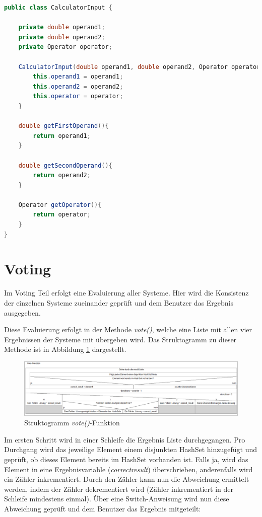 \begin{lstlisting}[language=Java,basicstyle=\scriptsize, caption=CalculatorInput Klasse,label=lst:CalculatorInput]
public class CalculatorInput {

    private double operand1;
    private double operand2;
    private Operator operator;

    CalculatorInput(double operand1, double operand2, Operator operator){
        this.operand1 = operand1;
        this.operand2 = operand2;
        this.operator = operator;
    }

    double getFirstOperand(){
        return operand1;
    }

    double getSecondOperand(){
        return operand2;
    }

    Operator getOperator(){
        return operator;
    }
}
\end{lstlisting}
\section{Voting}

Im Voting Teil erfolgt eine Evaluierung aller Systeme. Hier wird die Konsistenz der einzelnen Systeme zueinander geprüft und dem Benutzer das Ergebnis ausgegeben. 

Diese Evaluierung erfolgt in der Methode \textit{vote()}, welche eine Liste mit allen vier Ergebnissen der Systeme mit übergeben wird. Das Struktogramm zu dieser Methode ist in Abbildung \ref{fig:vote} dargestellt. 

\begin{figure}[!htbp]
    \centering
    \includegraphics[width=1\linewidth]{images/vote_function_struktogramm.PNG}
    \caption{Struktogramm \textit{vote()}-Funktion}
    \label{fig:vote}
\end{figure}

 Im ersten Schritt wird in einer Schleife die Ergebnis Liste durchgegangen. Pro Durchgang wird das jeweilige Element einem disjunkten HashSet hinzugefügt und geprüft, ob dieses Element bereits im HashSet vorhanden ist. Falls ja, wird das Element in eine Ergebnisvariable (\textit{correct\textunderscore result}) überschrieben, anderenfalls wird ein Zähler inkrementiert. Durch den Zähler kann nun die Abweichung ermittelt werden, indem der Zähler dekrementiert wird (Zähler inkrementiert in der Schleife mindestens einmal). Über eine Switch-Anweisung wird nun diese Abweichung geprüft und dem Benutzer das Ergebnis mitgeteilt:
 
